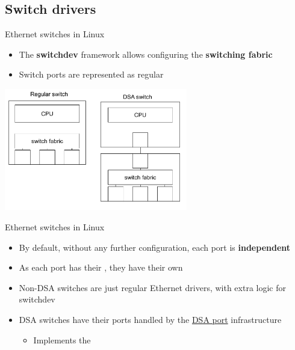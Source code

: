 \subsection{Switch drivers}

\begin{frame}{Ethernet switches in Linux}
	\begin{itemize}
		\item The \textbf{switchdev} framework allows configuring the \textbf{switching fabric}
		\item Switch ports are represented as regular 
	\end{itemize}
	\begin{center}
		\includegraphics[width=0.6\textwidth]{slides/networking-driver-switch/switches.pdf}
	\end{center}
\end{frame}

\begin{frame}{Ethernet switches in Linux}
	\begin{itemize}
		\item By default, without any further configuration, each port is \textbf{independent}
		\item As each port has their , they have their own 
		\item Non-DSA switches are just regular Ethernet drivers, with extra logic for switchdev
		\item DSA switches have their ports handled by the \href{https://elixir.bootlin.com/linux/v6.15.2/source/net/dsa/port.c}{DSA port} infrastructure
			\begin{itemize}
				\item Implements the 
			\end{itemize}
	\end{itemize}
\end{frame}

